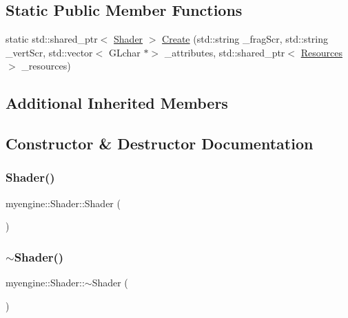 \subsection*{Static Public Member Functions}
\begin{DoxyCompactItemize}
\item 
static std\+::shared\+\_\+ptr$<$ \hyperlink{classmyengine_1_1_shader}{Shader} $>$ \hyperlink{classmyengine_1_1_shader_a0b65f89c7c9813f76c17a3e4a26b2ae5}{Create} (std\+::string \+\_\+frag\+Scr, std\+::string \+\_\+vert\+Scr, std\+::vector$<$ G\+Lchar $\ast$$>$ \+\_\+attributes, std\+::shared\+\_\+ptr$<$ \hyperlink{classmyengine_1_1_resources}{Resources} $>$ \+\_\+resources)
\end{DoxyCompactItemize}
\subsection*{Additional Inherited Members}


\subsection{Constructor \& Destructor Documentation}
\mbox{\label{classmyengine_1_1_shader_aee2f3e6536000e55269b4f3a2f9c478f}} 
\subsubsection{\texorpdfstring{Shader()}{Shader()}}
{\footnotesize\ttfamily myengine\+::\+Shader\+::\+Shader (\begin{DoxyParamCaption}{ }\end{DoxyParamCaption})}

\mbox{\label{classmyengine_1_1_shader_a857cbbb1aa3eb09212cadd9d5bd5edf9}} 
\subsubsection{\texorpdfstring{$\sim$\+Shader()}{~Shader()}}
{\footnotesize\ttfamily myengine\+::\+Shader\+::$\sim$\+Shader (\begin{DoxyParamCaption}{ }\end{DoxyParamCaption})}



